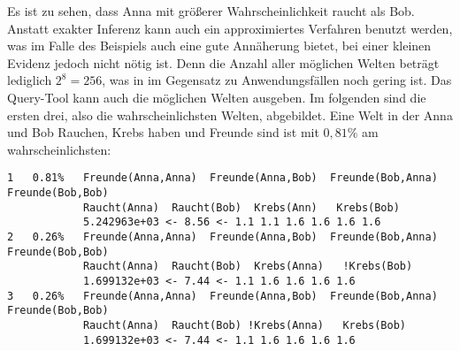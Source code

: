 Es ist zu sehen, dass Anna mit größerer Wahrscheinlichkeit raucht als Bob. \newline
Anstatt exakter Inferenz kann auch ein approximiertes Verfahren benutzt werden, was im Falle des Beispiels auch eine gute Annäherung bietet, bei einer kleinen Evidenz jedoch nicht nötig ist. Denn die Anzahl aller möglichen Welten beträgt lediglich $2^8 = 256$, was in im Gegensatz zu Anwendungsfällen noch gering ist. Das Query-Tool kann auch die möglichen Welten ausgeben. Im folgenden sind die ersten drei, also die wahrscheinlichsten Welten, abgebildet. Eine Welt in der Anna und Bob Rauchen, Krebs haben und Freunde sind ist mit $0,81\%$ am wahrscheinlichsten:
\begin{lstlisting}[backgroundcolor=\color{backcolour}]
1   0.81%   Freunde(Anna,Anna)  Freunde(Anna,Bob)  Freunde(Bob,Anna)  Freunde(Bob,Bob)
            Raucht(Anna)  Raucht(Bob)  Krebs(Ann)   Krebs(Bob)
            5.242963e+03 <- 8.56 <- 1.1 1.1 1.6 1.6 1.6 1.6
2   0.26%   Freunde(Anna,Anna)  Freunde(Anna,Bob)  Freunde(Bob,Anna)  Freunde(Bob,Bob)
            Raucht(Anna)  Raucht(Bob)  Krebs(Anna)   !Krebs(Bob)
            1.699132e+03 <- 7.44 <- 1.1 1.6 1.6 1.6 1.6
3   0.26%   Freunde(Anna,Anna)  Freunde(Anna,Bob)  Freunde(Bob,Anna)  Freunde(Bob,Bob)
            Raucht(Anna)  Raucht(Bob) !Krebs(Anna)   Krebs(Bob)
            1.699132e+03 <- 7.44 <- 1.1 1.6 1.6 1.6 1.6
\end{lstlisting}  